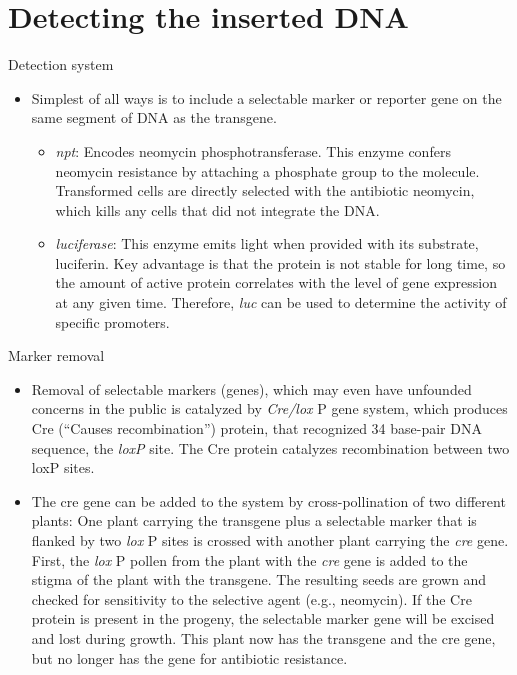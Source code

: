 \documentclass[ignorenonframetext,aspectratio=169]{beamer}
\providecommand{\tightlist}{%
  \setlength{\itemsep}{0pt}\setlength{\parskip}{0pt}}
\begin{document}
\hypertarget{detecting-the-inserted-dna}{%
\section{Detecting the inserted DNA}\label{detecting-the-inserted-dna}}

\begin{frame}{Detection system}
\protect\hypertarget{detection-system}{}

\begin{itemize}
\tightlist
\item
  Simplest of all ways is to include a selectable marker or reporter
  gene on the same segment of DNA as the transgene.

  \begin{itemize}
  \tightlist
  \item
    \emph{npt}: Encodes neomycin phosphotransferase. This enzyme confers
    neomycin resistance by attaching a phosphate group to the molecule.
    Transformed cells are directly selected with the antibiotic
    neomycin, which kills any cells that did not integrate the DNA.
  \item
    \emph{luciferase}: This enzyme emits light when provided with its
    substrate, luciferin. Key advantage is that the protein is not
    stable for long time, so the amount of active protein correlates
    with the level of gene expression at any given time. Therefore,
    \emph{luc} can be used to determine the activity of specific
    promoters.
  \end{itemize}
\end{itemize}

\end{frame}

\begin{frame}{Marker removal}
\protect\hypertarget{marker-removal}{}

\begin{itemize}
\tightlist
\item
  Removal of selectable markers (genes), which may even have unfounded
  concerns in the public is catalyzed by \emph{Cre/lox} P gene system,
  which produces Cre (``Causes recombination'') protein, that recognized
  34 base-pair DNA sequence, the \emph{\emph{loxP}} site. The Cre
  protein catalyzes recombination between two loxP sites.
\item
  The cre gene can be added to the system by cross-pollination of two
  different plants: One plant carrying the transgene plus a selectable
  marker that is flanked by two \emph{lox} P sites is crossed with
  another plant carrying the \emph{cre} gene. First, the \emph{lox} P
  pollen from the plant with the \emph{cre} gene is added to the stigma
  of the plant with the transgene. The resulting seeds are grown and
  checked for sensitivity to the selective agent (e.g., neomycin). If
  the Cre protein is present in the progeny, the selectable marker gene
  will be excised and lost during growth. This plant now has the
  transgene and the cre gene, but no longer has the gene for antibiotic
  resistance.
\end{itemize}

\end{frame}
\end{document}
